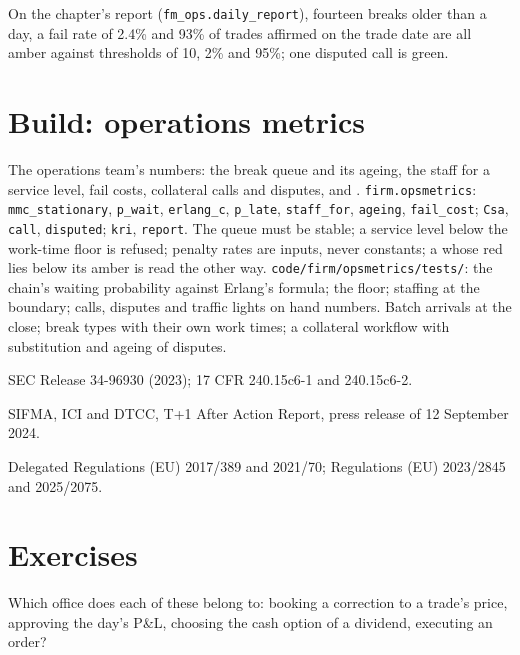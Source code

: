 On the chapter's report (\texttt{fm\_ops.daily\_report}), fourteen breaks older than a day, a fail rate of 2.4\% and 93\% of trades affirmed on the
trade date are all amber against thresholds of 10, 2\% and 95\%; one disputed call is green.

\section{Build: operations metrics}\label{bld:fm:operations:opsmetrics}

\begin{build}
 The operations team's numbers: the break queue and its ageing, the staff for a service level, fail costs, collateral calls and
disputes, and .
 \texttt{firm.opsmetrics}: \texttt{mmc\_stationary}, \texttt{p\_wait}, \texttt{erlang\_c}, \texttt{p\_late}, \texttt{staff\_for},
\texttt{ageing}, \texttt{fail\_cost}; \texttt{Csa}, \texttt{call}, \texttt{disputed}; \texttt{kri}, \texttt{report}.
 The queue must be stable; a service level below the work-time floor is refused; penalty rates are inputs, never constants; a  whose red lies below its amber is read the other way.
 \texttt{code/firm/opsmetrics/tests/}: the chain's waiting probability against Erlang's formula; the floor; staffing at the
boundary; calls, disputes and traffic lights on hand numbers.
 Batch arrivals at the close; break types with their own work times; a collateral workflow with substitution and ageing of
disputes.
\end{build}

\begin{omsources}
\item SEC Release 34-96930 (2023); 17 CFR 240.15c6-1 and 240.15c6-2.
\item SIFMA, ICI and DTCC, T+1 After Action Report, press release of 12 September 2024.
\item Delegated Regulations (EU) 2017/389 and 2021/70; Regulations (EU) 2023/2845 and 2025/2075.
\end{omsources}

\section{Exercises}

\begin{exercise}[$\star$]\label{exo:fm:operations:1}
Which office does each of these belong to: booking a correction to a trade's price, approving the day's P\&L, choosing the cash option of a
dividend, executing an order?
\end{exercise}

